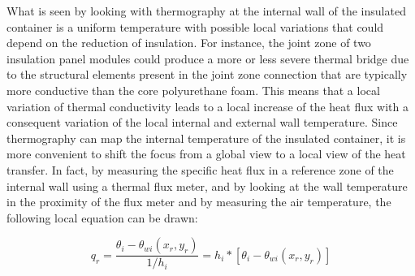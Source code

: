 \documentclass{tQRT2e}
\begin{document}
What is seen by looking with thermography at the internal wall of the insulated container is a uniform temperature with possible local variations that could depend on the reduction of insulation. For instance, the joint zone of two insulation panel modules could produce a more or less severe thermal bridge due to the structural elements present in the joint zone connection that are typically more conductive than the core polyurethane foam. This means that a local variation of thermal conductivity leads to a local increase of the heat flux with a consequent variation of the local internal and external wall temperature. Since thermography can map the internal temperature of the insulated container, it is more convenient to shift the focus from a global view to a local view of the heat transfer. In fact, by measuring the specific heat flux in a reference zone of the internal wall using a thermal flux meter, and by looking at the wall temperature in the proximity of the flux meter and by measuring the air temperature, the following local equation can be drawn:

\begin{equation}
q_r=\frac{\theta_i-\theta_{wi}(x_r,y_r )}{1/h_i} = h_i*[\theta_i-\theta_{wi}(x_r,y_r )]
\end{equation}
\end{document}
